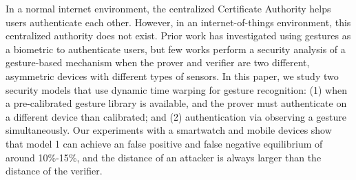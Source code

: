 
In  a normal internet environment, the centralized Certificate Authority helps users authenticate each other. However, in an internet-of-things environment, this centralized authority does not exist. Prior work has investigated using gestures as a biometric to authenticate users, but few works perform a security analysis of a gesture-based mechanism when the prover and verifier are two different, asymmetric devices with different types of sensors. In this paper, we study two security models that use dynamic time warping for gesture recognition: (1) when a pre-calibrated gesture library is available, and the prover must authenticate on a different device than calibrated; and (2) authentication via observing a gesture simultaneously. Our experiments with a smartwatch and mobile devices show that model 1 can achieve an false positive and false negative equilibrium of around 10\%-15\%, and the distance of an attacker is always larger than the distance of the verifier. 